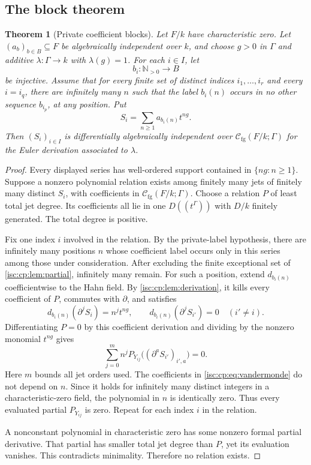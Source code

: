 \documentclass[11pt,letterpaper]{article}
\newtheorem{theorem}{Theorem}[section]
\theoremstyle{definition}
\theoremstyle{remark}
\newcommand{\N}{\mathbb N}
\newcommand{\Cfg}{\mathcal C_{\mathrm{fg}}}
\numberwithin{equation}{section}
\begin{document}
\subsection{The block theorem}

\begin{theorem}[Private coefficient blocks]\label{isc:cp:thm:generic}
Let $F/k$ have characteristic zero. Let $(a_b)_{b\in B}\subseteq F$ be
algebraically independent over $k$, and choose $g>0$ in $\Gamma$ and
additive $\lambda:\Gamma\to k$ with $\lambda(g)=1$. For each $i\in I$, let
\[
 b_i:\N_{>0}\longrightarrow B
\]
be injective. Assume that for every finite set of distinct indices
$i_1,\ldots,i_r$ and every $i=i_q$, there are infinitely many $n$ such that
the label $b_i(n)$ occurs in no other sequence $b_{i_p}$, at any position.
Put
\begin{equation}\label{isc:cp:eq:genericseries}
 S_i=\sum_{n\ge1}a_{b_i(n)}t^{ng}.
\end{equation}
Then $(S_i)_{i\in I}$ is differentially algebraically independent over
$\Cfg(F/k;\Gamma)$ for the Euler derivation associated to $\lambda$.
\end{theorem}
\begin{proof}
Every displayed series has well-ordered support contained in
$\{ng:n\ge1\}$. Suppose a nonzero polynomial relation exists among finitely
many jets of finitely many distinct $S_i$, with coefficients in
$\Cfg(F/k;\Gamma)$. Choose a relation $P$ of least total jet degree. Its
coefficients all lie in one $D((t^\Gamma))$ with $D/k$ finitely generated.
The total degree is positive.

Fix one index $i$ involved in the relation. By the private-label hypothesis,
there are infinitely many positions $n$ whose coefficient label occurs only
in this series among those under consideration. After excluding the finite
exceptional set of \cref{isc:cp:lem:partial}, infinitely many remain. For
such a position, extend $d_{b_i(n)}$ coefficientwise to the Hahn field. By
\cref{isc:cp:lem:derivation}, it kills every coefficient of $P$, commutes
with $\partial$, and satisfies
\[
 d_{b_i(n)}(\partial^jS_i)=n^j t^{ng},\qquad
 d_{b_i(n)}(\partial^jS_{i'})=0\quad(i'\ne i).
\]
Differentiating $P=0$ by this coefficient derivation and dividing by the
nonzero monomial $t^{ng}$ gives
\begin{equation}\label{isc:cp:eq:vandermonde}
 \sum_{j=0}^m n^j P_{Y_{ij}}\bigl((\partial^aS_{i'})_{i',a}\bigr)=0.
\end{equation}
Here $m$ bounds all jet orders used. The coefficients in
\eqref{isc:cp:eq:vandermonde} do not depend on $n$. Since it holds for
infinitely many distinct integers in a characteristic-zero field, the
polynomial in $n$ is identically zero. Thus every evaluated partial
$P_{Y_{ij}}$ is zero. Repeat for each index $i$ in the relation.

A nonconstant polynomial in characteristic zero has some nonzero formal
partial derivative. That partial has smaller total jet degree than $P$, yet
its evaluation vanishes. This contradicts minimality. Therefore no relation
exists.
\end{proof}
\end{document}
